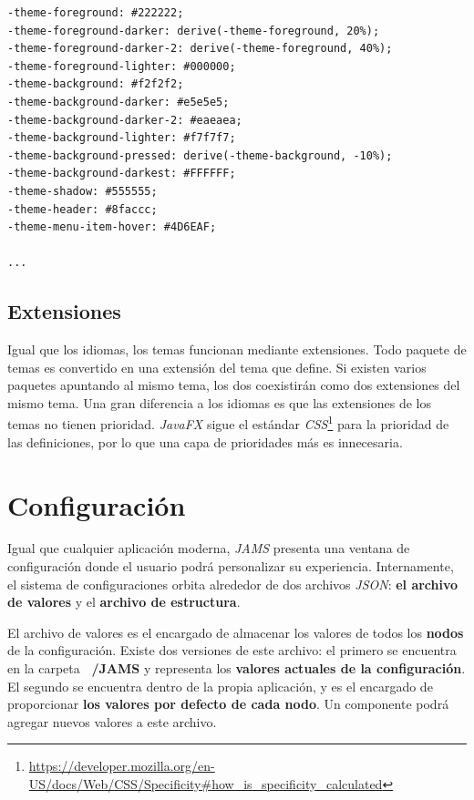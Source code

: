 \begin{lstlisting}[frame=single,label={lst:global.css}]
-theme-foreground: #222222;
-theme-foreground-darker: derive(-theme-foreground, 20%);
-theme-foreground-darker-2: derive(-theme-foreground, 40%);
-theme-foreground-lighter: #000000;
-theme-background: #f2f2f2;
-theme-background-darker: #e5e5e5;
-theme-background-darker-2: #eaeaea;
-theme-background-lighter: #f7f7f7;
-theme-background-pressed: derive(-theme-background, -10%);
-theme-background-darkest: #FFFFFF;
-theme-shadow: #555555;
-theme-header: #8faccc;
-theme-menu-item-hover: #4D6EAF;

...
\end{lstlisting}

\subsection{Extensiones}\label{subsec:temas-extensiones}

Igual que los idiomas, los temas funcionan mediante extensiones.
Todo paquete de temas es convertido en una extensión del tema que define.
Si existen varios paquetes apuntando al mismo tema, los dos coexistirán
como dos extensiones del mismo tema.
Una gran diferencia a los idiomas es que las extensiones de los temas
no tienen prioridad.
\textit{JavaFX} sigue el estándar
\textit{CSS}\footnote{\url{https://developer.mozilla.org/en-US/docs/Web/CSS/Specificity\#how_is_specificity_calculated}}
para la prioridad de las definiciones,
por lo que una capa de prioridades más es innecesaria.


\section{Configuración}\label{sec:configuracion}

Igual que cualquier aplicación moderna, \textit{JAMS} presenta una
ventana de configuración donde el usuario podrá personalizar su experiencia.
Internamente, el sistema de configuraciones orbita alrededor de dos archivos \textit{JSON}:
\textbf{el archivo de valores} y el \textbf{archivo de estructura}.

\noindent El archivo de valores es el encargado de almacenar los valores de
todos los \textbf{nodos} de la configuración.
Existe dos versiones de este archivo:
el primero se encuentra en la carpeta \textbf{~/JAMS} y representa los \textbf{valores
actuales de la configuración}.
El segundo se encuentra dentro de la propia aplicación, y es el encargado de
proporcionar \textbf{los valores por defecto de cada nodo}.
Un componente podrá agregar nuevos valores a este archivo.

